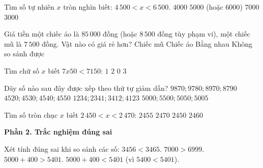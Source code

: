 \begin{ex} %
Tìm số tự nhiên $x$ tròn nghìn biết: $4\,500 < x < 6\,500$.
\choice
{$4000$}
{\True $5000$ (hoặc $6000$)}
{$7000$}
{$3000$}
\end{ex}

\begin{ex} %
Giá tiền một chiếc áo là $85\,000$ đồng (hoặc $8\,500$ đồng tùy phạm vi), một chiếc mũ là $7\,500$ đồng. Vật nào có giá rẻ hơn?
\choice
{\True Chiếc mũ}
{Chiếc áo}
{Bằng nhau}
{Không so sánh được}
\end{ex}

\begin{ex} %
Tìm chữ số $x$ biết $7x50 < 7150$:
\choice
{$1$}
{$2$}
{\True $0$}
{$3$}
\end{ex}

\begin{ex} %
Dãy số nào sau đây được xếp theo thứ tự giảm dần?
\choice
{\True $9870; 9780; 8970; 8790$}
{$4520; 4530; 4540; 4550$}
{$1234; 2341; 3412; 4123$}
{$5000; 5500; 5050; 5005$}
\end{ex}

\begin{ex} %
Tìm số tròn chục $x$ biết $2\,450 < x < 2\,470$:
\choice
{$2455$}
{$2470$}
{$2450$}
{\True $2460$}
\end{ex}

\textbf{Phần 2. Trắc nghiệm đúng sai}

\begin{ex} %
Xét tính đúng sai khi so sánh các số:
\choiceTF
{\True $3456 < 3465$.}
{\True $7000 > 6999$.}
{$5000 + 400 > 5401$.}
{\True $5000 + 400 < 5401$ (vì $5400 < 5401$).}
\end{ex}

